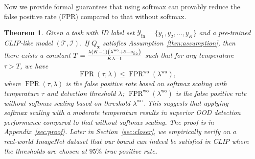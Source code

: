 \documentclass{article}
\def\*#1{\mathbf{#1}}
\newtheorem{theorem}{Theorem}[section]
\begin{document}
Now we provide formal guarantees that using softmax can provably reduce  the false positive rate (FPR) compared to that without softmax.

\begin{theorem}
\label{thm:main}
Given a task with ID label set $\mathcal{Y}_\text{in}=\{y_1, y_2,...,y_K\}$ and a pre-trained CLIP-like model $(\mathcal{T}, \mathcal{I})$. If $Q_{\*x}$ satisfies Assumption~\ref{thm:assumption}, then there exists a constant $T = { \lambda(K - 1)\left(\lambda^{\text{wo}} + \delta - s_{\hat{y}_{2}}\right) \over K\lambda-1} $ such that for any temperature $\tau>T$,
we have
$$
\operatorname{FPR}(\tau, \lambda) \leq \operatorname{FPR}^{\text{wo}}(\lambda^{\text{wo}} ),
$$
where $\operatorname{FPR}(\tau, \lambda)$ is the false positive rate based on softmax scaling \emph{with} temperature $\tau$ and detection threshold $\lambda$; $ \operatorname{FPR}^{\text{wo}}(\lambda^{\text{wo}} )$ is the false positive rate \emph{without} softmax scaling based on threshold $\lambda^{\text{wo}}$. This suggests that applying softmax scaling with a moderate temperature results in superior OOD detection performance compared to that without softmax scaling. 
The proof is in Appendix~\ref{sec:proof}. Later in Section~\ref{sec:closer}, we empirically verify on a real-world ImageNet dataset that our bound can indeed be satisfied in CLIP where the thresholds are chosen at $95\%$ true positive rate. 
\end{theorem}
\end{document}
